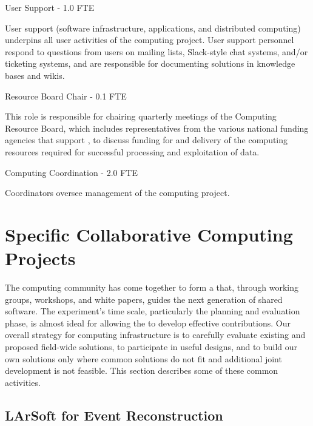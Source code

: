 \begin{description}
\item {User Support - 1.0 FTE}

User support (software infrastructure, applications, and distributed computing) underpins all user activities of the  computing project. 
User support %
personnel %
respond to questions from users on mailing lists, Slack-style chat systems, and/or ticketing systems, %
and are responsible for documenting solutions in knowledge bases and wikis.

\item {Resource Board Chair - 0.1 FTE}

This role is responsible for chairing quarterly meetings of the Computing Resource Board, which includes representatives from the %
various national funding agencies that support , to discuss %
funding for and delivery of the computing resources required for successful processing and exploitation of  data. %

\item {Computing Coordination - 2.0 FTE}

Coordinators oversee management of the computing project. 
\end{description}



\section{Specific Collaborative Computing Projects}
\label{ch:exec-comp-gov-coop}

The  computing community has come together to form a \cite{Alves:2017she} that, through working groups, workshops, and white papers, guides the next generation of shared  software.  
The  experiment's time scale, particularly the planning and evaluation phase, is almost ideal for allowing the  to develop effective contributions. Our overall strategy for computing infrastructure is to carefully evaluate existing and proposed field-wide solutions, to participate in useful designs, and to build our own solutions only where common solutions do not fit and additional joint development is not feasible.   This section describes some of these common activities. 



\subsection{LArSoft for Event Reconstruction}

